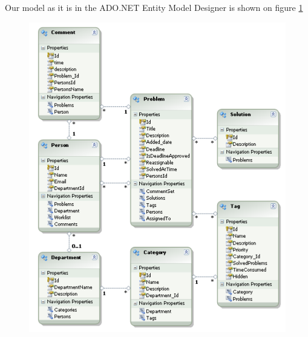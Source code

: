 Our model as it is in the ADO.NET Entity Model Designer is shown on figure \ref{fig:edmxModel}
\begin{figure}[htb]
	\centering
		\includegraphics[scale=0.7]{input/implementation/mvc/Model.pdf}
	\label{fig:edmxModel}
\end{figure}
